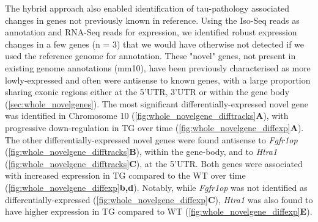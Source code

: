 The hybrid approach also enabled identification of tau-pathology associated changes in genes not previously known in reference. Using the Iso-Seq reads as annotation and RNA-Seq reads for expression, we identified robust expression changes in a few genes (n = 3) that we would have otherwise not detected if we used the reference genome for annotation. These "novel" genes, not present in existing genome annotations (mm10), have been previously characterised as more lowly-expressed and often were antisense to known genes, with a large proportion sharing exonic regions either at the 5'UTR, 3'UTR or within the gene body (\cref{sec:whole_novelgenes}). The most significant differentially-expressed novel gene was identified in Chromosome 10 (\cref{fig:whole_novelgene_difftracks}\textbf{A}), with progressive down-regulation in TG over time (\cref{fig:whole_novelgene_diffexp}\textbf{A}). The other differentially-expressed novel genes were found antisense to \textit{Fgfr1op} (\cref{fig:whole_novelgene_difftracks}\textbf{B}), within the gene-body, and to \textit{Htra1}  (\cref{fig:whole_novelgene_difftracks}\textbf{C}), at the 5'UTR. Both genes were associated with increased expression in TG compared to the WT over time (\cref{fig:whole_novelgene_diffexp}\textbf{b,d}). Notably, while \textit{Fgfr1op} was not identified as differentially-expressed (\cref{fig:whole_novelgene_diffexp}\textbf{C}), \textit{Htra1} was also found to have higher expression in TG compared to WT (\cref{fig:whole_novelgene_diffexp}\textbf{E}).     

